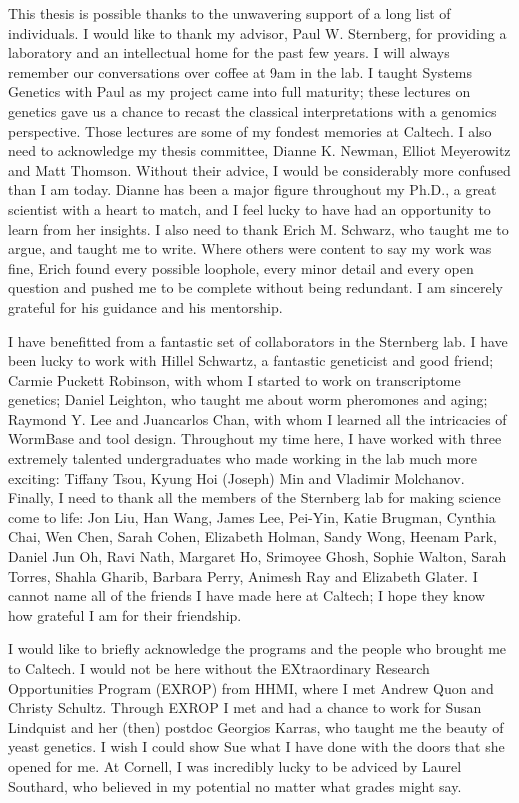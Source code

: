 \documentclass[12pt]{caltech_thesis}
\begin{document}
\begin{acknowledgements}
  This thesis is possible thanks to the unwavering support of a long list of
  individuals. I would like to thank my advisor, Paul W. Sternberg, for
  providing a laboratory and an intellectual home for the past few years. I will
  always remember our conversations over coffee at 9am in the lab. I taught
  Systems Genetics with Paul as my project came into full maturity; these
  lectures on genetics gave us a chance to recast the classical interpretations
  with a genomics perspective. Those lectures are some of my fondest memories
  at Caltech. I also need to acknowledge my thesis committee, Dianne K. Newman,
  Elliot Meyerowitz and Matt Thomson. Without their advice, I would be
  considerably more confused than I am today. Dianne has been a major figure
  throughout my Ph.D., a great scientist with a heart to match, and I feel
  lucky to have had an opportunity to learn from her insights. I also need to
  thank Erich M. Schwarz, who taught me to argue, and taught me to write. Where
  others were content to say my work was fine, Erich found every possible
  loophole, every minor detail and every open question and pushed me to be
  complete without being redundant. I am sincerely grateful for his guidance and
  his mentorship.

  I have benefitted from a fantastic set of collaborators in the Sternberg lab.
  I have been lucky to work with Hillel Schwartz, a fantastic geneticist and
  good friend; Carmie Puckett Robinson, with whom I started to work on
  transcriptome genetics; Daniel Leighton, who taught me about worm pheromones
  and aging; Raymond Y. Lee and Juancarlos Chan, with whom I learned all the
  intricacies of WormBase and tool design. Throughout my time here, I have
  worked with three extremely talented undergraduates who made working in the
  lab much more exciting: Tiffany Tsou, Kyung Hoi (Joseph) Min and Vladimir
  Molchanov. Finally, I need to thank all the members of the Sternberg lab for
  making science come to life: Jon Liu, Han Wang, James Lee, Pei-Yin, Katie
  Brugman, Cynthia Chai, Wen Chen, Sarah Cohen, Elizabeth Holman, Sandy Wong,
  Heenam Park, Daniel Jun Oh, Ravi Nath, Margaret Ho, Srimoyee Ghosh, Sophie
  Walton, Sarah Torres, Shahla Gharib, Barbara Perry, Animesh Ray and Elizabeth
  Glater. I cannot name all of the friends I have made here at Caltech; I hope
  they know how grateful I am for their friendship.

  I would like to briefly acknowledge the programs and the people who brought me
  to Caltech. I would not be here without the EXtraordinary Research
  Opportunities Program (EXROP) from HHMI, where I met Andrew Quon and Christy
  Schultz. Through EXROP I met and had a chance to work for Susan Lindquist and
  her (then) postdoc Georgios Karras, who taught me the beauty of yeast
  genetics. I wish I could show Sue what I have done with the doors that she
  opened for me. At Cornell, I was incredibly lucky to be adviced by Laurel
  Southard, who believed in my potential no matter what grades might say.


\end{acknowledgements}
\end{document}
